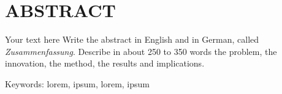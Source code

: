 \documentclass[../thesis.tex]{subfiles}
\begin{document}
\chapter*{ABSTRACT}

Your text here Write the abstract in English and in German, called \emph{Zusammenfassung}.
Describe in about 250 to 350 words the problem, the innovation, the method, the results and implications.

\vspace{\baselineskip}
\noindent Keywords: lorem, ipsum, lorem, ipsum


\end{document}
